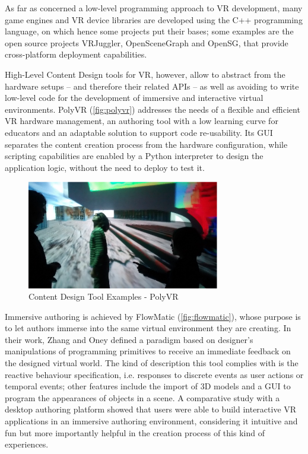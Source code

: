 As far as concerned a low-level programming approach to \gls{VR} development, many game engines and VR device libraries are developed using the C++ programming language, on which hence some projects put their bases; some examples are the open source projects VRJuggler, OpenSceneGraph and OpenSG, that provide cross-platform deployment capabilities.

High-Level Content Design tools for \gls{VR}, however, allow to abstract from the hardware setups -- and therefore their related APIs -- as well as avoiding to write low-level code for the development of immersive and interactive virtual environments. PolyVR \cite{perret_polyvr_2014} (\autoref{fig:polyvr}) addresses the needs of a flexible and efficient VR hardware management, an authoring tool with a low learning curve for educators and an adaptable solution to support code re-usability. Its \gls{GUI} separates the content creation process from the hardware configuration, while scripting capabilities are enabled by a Python interpreter to design the application logic, without the need to deploy to test it.
\begin{figure}[h]
    \centering
    \includegraphics[width=0.75\textwidth]{Figures/Background/tools/polyvr.png}
    \caption{Content Design Tool Examples - PolyVR}
    \label{fig:polyvr}
\end{figure}

Immersive authoring is achieved by FlowMatic \cite{zhang_flowmatic_2020} (\autoref{fig:flowmatic}), whose purpose is to let authors immerse into the same virtual environment they are creating. In their work, Zhang and Oney defined a paradigm based on designer's manipulations of programming primitives to receive an immediate feedback on the designed virtual world. The kind of description this tool complies with is the reactive behaviour specification, i.e. responses to discrete events as user actions or temporal events; other features include the import of 3D models and a \gls{GUI} to program the appearances of objects in a scene. A comparative study with a desktop authoring platform showed that users were able to build interactive VR applications in an immersive authoring environment, considering it intuitive and fun but more importantly helpful in the creation process of this kind of experiences.


